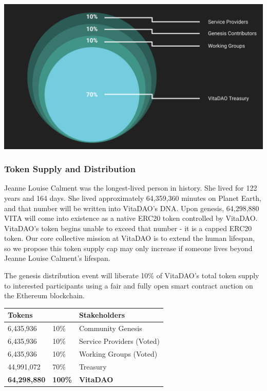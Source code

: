 \documentclass[10pt,letterpaper]{article}
\begin{document}
\vspace{15pt}
\begin{center}
\includegraphics[width=\linewidth]{images/Initial Token Allocation.png} 
\end{center}

\subsubsection{Token Supply and Distribution}
Jeanne Louise Calment was the longest-lived person in history. She lived for 122 years and 164 days. She lived approximately 64,359,360 minutes on Planet Earth, and that number will be written into  VitaDAO’s DNA. Upon genesis, 64,298,880 VITA will come into existence as a native ERC20 token controlled by VitaDAO. VitaDAO’s token begins unable to exceed that number - it is a capped ERC20 token. Our core collective mission at VitaDAO is to extend the human lifespan, so we propose this token supply cap may only increase if someone lives beyond Jeanne Louise Calment's lifespan.

The genesis distribution event will liberate 10\% of VitaDAO's total token supply to interested participants using a fair and fully open smart contract auction on the Ethereum blockchain.

\begin{table}[h!]
  \begin{center}
    \setlength{\extrarowheight}{5pt}
	\begin{tabular}{p{}p{}p{}}
		\textbf{Tokens} & & \textbf{Stakeholder}s \\ 
		\hline
		6,435,936 & 10\% & Community Genesis \\ 
		6,435,936 & 10\% & Service Providers (Voted) \\ 
		6,435,936 & 10\% & Working Groups (Voted) \\ 
		44,991,072 & 70\% & Treasury \\ 
		\hline 
		\textbf{64,298,880} & \textbf{100\%} & \textbf{VitaDAO} \\ 
		\hline 
	\end{tabular} 
  \end{center}
\end{table}
\end{document}
